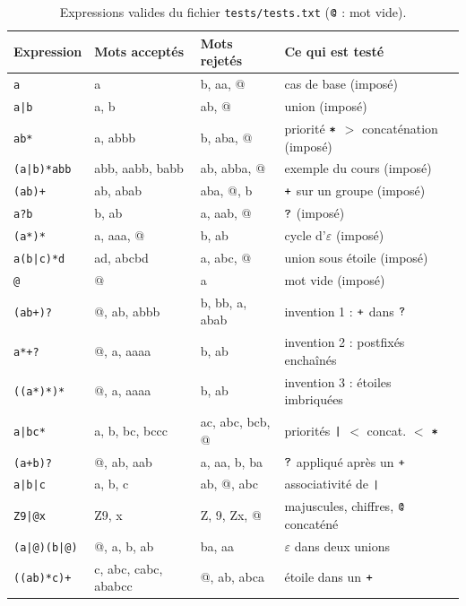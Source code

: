 \documentclass[12pt,a4paper]{article}
\newcommand{\code}[1]{{\fontsize{10}{12}\selectfont\texttt{#1}}}
\newcommand{\eps}{\ensuremath{\varepsilon}}
\newcommand{\tok}[1]{\ensuremath{\text{\fontsize{10}{12}\selectfont\ttfamily #1}}}
\begin{document}
\begin{table}[H]
\centering\small
\begin{tabularx}{\linewidth}{l l l L}
\toprule
Expression & Mots acceptés & Mots rejetés & Ce qui est testé \\
\midrule
\code{a}          & a                   & b, aa, @        & cas de base (imposé) \\
\code{a|b}        & a, b                & ab, @           & union (imposé) \\
\code{ab*}        & a, abbb             & b, aba, @       & priorité \tok{*} $>$ concaténation (imposé) \\
\code{(a|b)*abb}  & abb, aabb, babb     & ab, abba, @     & exemple du cours (imposé) \\
\code{(ab)+}      & ab, abab            & aba, @, b       & \tok{+} sur un groupe (imposé) \\
\code{a?b}        & b, ab               & a, aab, @       & \tok{?} (imposé) \\
\code{(a*)*}      & a, aaa, @           & b, ab           & cycle d'\eps{} (imposé) \\
\code{a(b|c)*d}   & ad, abcbd           & a, abc, @       & union sous étoile (imposé) \\
\code{@}          & @                   & a               & mot vide (imposé) \\
\midrule
\code{(ab+)?}     & @, ab, abbb         & b, bb, a, abab  & invention 1 : \tok{+} dans \tok{?} \\
\code{a*+?}       & @, a, aaaa          & b, ab           & invention 2 : postfixés enchaînés \\
\code{((a*)*)*}   & @, a, aaaa          & b, ab           & invention 3 : étoiles imbriquées \\
\midrule
\code{a|bc*}      & a, b, bc, bccc      & ac, abc, bcb, @ & priorités \tok{|} $<$ concat. $<$ \tok{*} \\
\code{(a+b)?}     & @, ab, aab          & a, aa, b, ba    & \tok{?} appliqué après un \tok{+} \\
\code{a|b|c}      & a, b, c             & ab, @, abc      & associativité de \tok{|} \\
\code{Z9|@x}      & Z9, x               & Z, 9, Zx, @     & majuscules, chiffres, \tok{@} concaténé \\
\code{(a|@)(b|@)} & @, a, b, ab         & ba, aa          & \eps{} dans deux unions \\
\code{((ab)*c)+}  & c, abc, cabc, ababcc & @, ab, abca    & étoile dans un \tok{+} \\
\bottomrule
\end{tabularx}
\caption{Expressions valides du fichier \code{tests/tests.txt} (\tok{@} : mot vide).}
\end{table}
\end{document}
